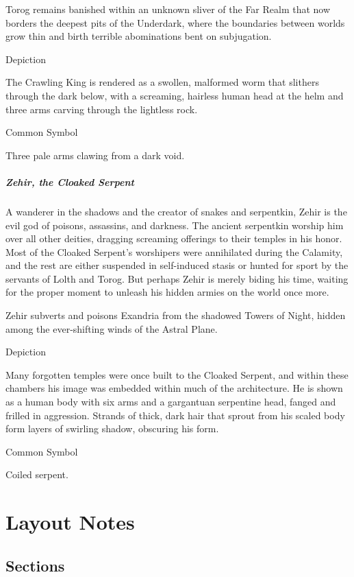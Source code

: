 \documentclass[letterpaper, twocolumn, openany, nodeprecatedcode, layout=true]{dndbook}
\begin{document}
Torog remains banished within an unknown sliver of the Far Realm that now borders the deepest
pits of the Underdark, where the boundaries between worlds grow thin and birth terrible
abominations bent on subjugation.

\subparagraph{Depiction}
The Crawling King is rendered as a swollen, malformed worm that slithers through the dark
below, with a screaming, hairless human head at the helm and three arms carving through the
lightless rock.

\subparagraph{Common Symbol}
Three pale arms clawing from a dark void.

\subsubsection{Zehir, the Cloaked Serpent}

A wanderer in the shadows and the creator of snakes and serpentkin, Zehir is the evil
god of poisons, assassins, and darkness. The ancient serpentkin worship him over all
other deities, dragging screaming offerings to their temples in his honor. Most of the
Cloaked Serpent’s worshipers were annihilated during the Calamity, and the rest are
either suspended in self-induced stasis or hunted for sport by the servants of Lolth
and Torog. But perhaps Zehir is merely biding his time, waiting for the proper moment
to unleash his hidden armies on the world once more.

Zehir subverts and poisons Exandria from the shadowed Towers of Night, hidden among the
ever-shifting winds of the Astral Plane.

\subparagraph{Depiction}
Many forgotten temples were once built to the Cloaked Serpent, and within these chambers
his image was embedded within much of the architecture. He is shown as a human body with
six arms and a gargantuan serpentine head, fanged and frilled in aggression. Strands of
thick, dark hair that sprout from his scaled body form layers of swirling shadow,
obscuring his form.

\subparagraph{Common Symbol}
Coiled serpent.

\part{Layout Notes}

\chapter{Sections}
\end{document}
